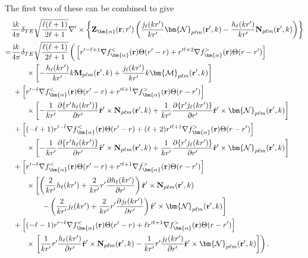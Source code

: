 The first two of these can be combined to give
\begin{equation}
\begin{split}
&\frac{\mathrm{i}k}{4\pi}\delta_{TE}\sqrt{\frac{\ell(\ell + 1)}{2\ell + 1}}\nabla'\times\left\{\mathbf{Z}_{\bm{\alpha}}(\mathbf{r};r')\left(\frac{j_\ell(kr')}{kr'}\bm{\mathcal{N}}_{p\ell m}(\mathbf{r}',k) - \frac{h_\ell(kr')}{kr'}\mathbf{N}_{p\ell m}(\mathbf{r}',k)\right)\right\}\\
=& \frac{\mathrm{i}k}{4\pi}\delta_{TE}\sqrt{\frac{\ell(\ell + 1)}{2\ell + 1}}\left( \vphantom{\frac{1}{kr'}} \left[r'^{-\ell + 1}\nabla f_{\bm{\alpha}}^<(\mathbf{r})\Theta(r' - r) + r'^{\ell + 2}\nabla f_{\bm{\alpha}}^>(\mathbf{r})\Theta(r - r')\right]\right.\\
&\qquad\times\left[-\frac{h_\ell(kr')}{kr'}k\mathbf{M}_{p\ell m}(\mathbf{r}',k) + \frac{j_\ell(kr')}{kr'}k\bm{\mathcal{M}}_{p\ell m}(\mathbf{r}',k)\right]\\
&\;+ \left[r'^{-\ell}\nabla f_{\bm{\alpha}}^<(\mathbf{r})\Theta(r' - r) + r'^{\ell + 1}\nabla f_{\bm{\alpha}}^>(\mathbf{r})\Theta(r - r')\right]\\
&\qquad\times\left[-\frac{1}{kr'}\frac{\partial\{r'h_\ell(kr')\}}{\partial r'}\hat{\mathbf{r}}'\times\mathbf{N}_{p\ell m}(\mathbf{r}',k) + \frac{1}{kr'}\frac{\partial\{r'j_\ell(kr')\}}{\partial r'}\hat{\mathbf{r}}'\times\bm{\mathcal{N}}_{p\ell m}(\mathbf{r}',k)\right]\\
&\;+ \left[(-\ell + 1)r'^{-\ell}\nabla f_{\bm{\alpha}}^<(\mathbf{r})\Theta(r' - r) + (\ell + 2)r'^{\ell + 1}\nabla f_{\bm{\alpha}}^>(\mathbf{r})\Theta(r - r')\right]\\
&\qquad\times \left[-\frac{1}{kr'}\frac{\partial\{r'h_\ell(kr')\}}{\partial r'}\hat{\mathbf{r}}'\times\mathbf{N}_{p\ell m}(\mathbf{r}',k) + \frac{1}{kr'}\frac{\partial\{r'j_\ell(kr')\}}{\partial r'}\hat{\mathbf{r}}'\times\bm{\mathcal{N}}_{p\ell m}(\mathbf{r}',k)\right]\\
&\;+ \left[r'^{-\ell}\nabla f_{\bm{\alpha}}^<(\mathbf{r})\Theta(r' - r) + r'^{\ell + 1}\nabla f_{\bm{\alpha}}^>(\mathbf{r})\Theta(r - r')\right]\\
&\qquad\times \left[\left(\frac{2}{kr'}h_\ell(kr') + \frac{2}{kr'}r'\frac{\partial h_\ell(kr')}{\partial r'}\right)\hat{\mathbf{r}}'\times\mathbf{N}_{p\ell m}(\mathbf{r}',k)\right.\\
&\qquad\qquad\left.- \left(\frac{2}{kr'}j_\ell(kr') + \frac{2}{kr'}r'\frac{\partial j_\ell(kr')}{\partial r'}\right)\hat{\mathbf{r}}'\times\bm{\mathcal{N}}_{p\ell m}(\mathbf{r}',k)\right]\\
&\;+\left[(-\ell - 1)r'^{-\ell}\nabla f_{\bm{\alpha}}^<(\mathbf{r})\Theta(r' - r) + \ell r'^{\ell + 1}\nabla f_{\bm{\alpha}}^>(\mathbf{r})\Theta(r - r')\right]\\
&\qquad\times\left.\left[\frac{1}{kr'}r'\frac{h_\ell(kr')}{\partial r'}\hat{\mathbf{r}}'\times\mathbf{N}_{p\ell m}(\mathbf{r}',k) - \frac{1}{kr'}r'\frac{j_\ell(kr')}{\partial r'}\hat{\mathbf{r}}'\times\bm{\mathcal{N}}_{p\ell m}(\mathbf{r}',k)\right]\right).
\end{split}
\end{equation}
